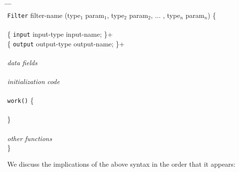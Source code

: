 \documentclass[draft]{article}
\begin{document}
\begin{tabbing}
\hspace{0.2in} \= \hspace{0.2in} \= \hspace{0.2in} \= \hspace{0.2in} \= \\

{\tt Filter} filter-name (type$_1$ param$_1$, type$_2$ param$_2$,
... , type$_n$ param$_n$) \{ \\ \\

\> \{ {\tt input} input-type input-name; \}+ \\
\> \{ {\tt output} output-type output-name; \}+ \\ \\

\> {\it data fields} \\ \\

\> {\it initialization code} \\ \\

\> {\tt work()} \{ \\ \\
\> \} \\ \\

\> {\it other functions} \\

\}
\end{tabbing}

We discuss the implications of the above syntax in the order that it
appears:
\end{document}
